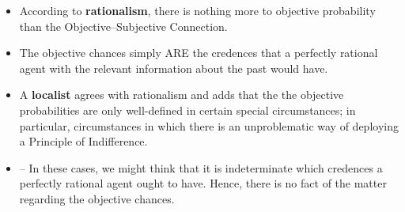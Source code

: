\documentclass[12pt]{extarticle}
\begin{document}
\begin{itemize}

\item  According to \textbf{rationalism}, there is nothing more to objective probability than the Objective--Subjective Connection.

\item The objective chances simply ARE the credences that a perfectly rational agent with the relevant information about the past would have. 

\item A \textbf{localist} agrees with rationalism and adds that the the objective probabilities are only well-defined in certain special circumstances; in particular, circumstances in which there is an unproblematic way of deploying a Principle of Indifference.

\item[] -- In these cases, we might think that it is indeterminate which credences a perfectly rational agent ought to have. Hence, there is no fact of the matter regarding the objective chances. 


\end{itemize}
\end{document}
